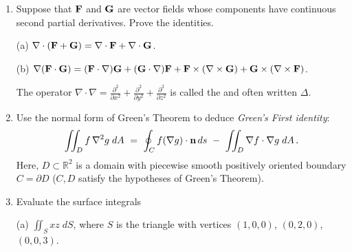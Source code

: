 \documentclass[12pt]{article}
\newcommand{\bfF}{{\bf F}}    %
\newcommand{\bfG}{{\bf G}}    %
\newcommand{\bfn}{{\bf n}}    %
\begin{document}
\begin{enumerate}
\item Suppose that $\bfF$ and $\bfG$ are vector fields whose components have continuous second partial derivatives.
  Prove the identities.

  (a) $\nabla\cdot(\bfF +\bfG) = \nabla\cdot\bfF + \nabla\cdot\bfG$.

  (b) $\nabla(\bfF\cdot\bfG) = (\bfF\cdot\nabla) \bfG + (\bfG\cdot\nabla) \bfF
  + \bfF\times (\nabla\times\bfG) + \bfG\times (\nabla\times\bfF)$.

  The operator $\nabla\cdot\nabla=\frac{\partial^2}{\partial x^2}+\frac{\partial^2}{\partial y^2}+\frac{\partial^2}{\partial z^2}$
  is called the {\color{blue}{\sl Laplacian}} and often written {\color{blue}$\Delta$}.
\vspace{-2pt}
   
\item Use the normal form of Green's Theorem to deduce {\sl Green's First identity}:
  \[
  \iint_D f\,\nabla^2 g\; dA\ =\ \oint_C f (\nabla g)\cdot \bfn \, ds\ -\ \iint_D \nabla f \cdot \nabla g\; dA\,.
  \]
  Here, $D\subset{\mathbb R}^2$ is a domain with piecewise smooth positively oriented boundary $C=\partial D$ ($C,D$ satisfy the
  hypotheses of Green's Theorem).
\vspace{-2pt}


\item Evaluate the surface integrals

  (a) ${\displaystyle \iint_S xz\;dS}$, where $S$ is the triangle with vertices $(1,0,0)$, $(0,2,0)$, $(0,0,3)$.


\end{enumerate}
\end{document}
